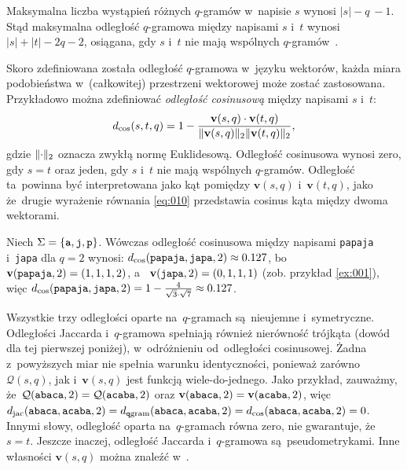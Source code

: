 \documentclass{praca1}
\DeclarePairedDelimiter{\norm}{\lVert}{\rVert}
\begin{document}

Maksymalna liczba wystąpień różnych $q$-gramów w~napisie $s$ wynosi $|s| - q~- 1$. Stąd maksymalna odległość $q$-gramowa między napisami $s$ i~$t$ wynosi $|s| + |t| - 2q - 2$, osiągana, gdy $s$ i~$t$ nie mają wspólnych $q$-gramów~\cite{Loo2014:stringdist}.

Skoro zdefiniowana została odległość $q$-gramowa w~języku wektorów, każda miara podobieństwa w~(całkowitej) przestrzeni wektorowej może zostać zastosowana. Przykładowo można zdefiniować \emph{odległość cosinusową} między napisami $s$ i~$t$:
\begin{equation}
\label{eq:010}
d_{\mathrm{cos}}(s,t,q) = 1 - \frac{ \mathbf{v}(s,q) \cdot \mathbf{v}(t,q) }{ \norm{\mathbf{v}(s,q)}_2  \norm{\mathbf{v}(t,q)}_2 },
\end{equation}
gdzie $\norm{\cdot}_2$ oznacza zwykłą normę Euklidesową. Odległość cosinusowa wynosi zero, gdy $s=t$ oraz jeden, gdy $s$ i~$t$ nie mają wspólnych $q$-gramów. Odległość ta~powinna być interpretowana jako kąt pomiędzy $\mathbf{v}(s,q)$ i~$\mathbf{v}(t,q)$, jako że~drugie wyrażenie równania \eqref{eq:010} przedstawia cosinus kąta między dwoma wektorami.

\begin{example}
Niech $\Sigma = \{\verb|a|, \verb|j|, \verb|p|\}$. Wówczas odległość cosinusowa między napisami \verb|papaja| i~\verb|japa| dla $q = 2$ wynosi: $d_{\mathrm{cos}}(\verb|papaja|, \verb|japa|, 2) \approx 0.127$, bo~$\mathbf{v}( \verb|papaja|,2) = (1, 1, 1, 2)$, a~ $\mathbf{v}( \verb|japa|,2) = (0, 1, 1, 1)$ (zob. przykład \ref{ex:001}), więc $d_{\mathrm{cos}}(\verb|papaja|, \verb|japa|, 2) = 1 - \frac{4}{\sqrt{3}\cdot\sqrt{7}} \approx 0.127$.
\end{example}

Wszystkie trzy odległości oparte na~$q$-gramach są~nieujemne i~symetryczne. Odległości Jaccarda i~$q$-gramowa spełniają również nierówność trójkąta (dowód dla tej pierwszej poniżej), w~odróżnieniu od~odległości cosinusowej. Żadna z~powyższych miar nie spełnia warunku identyczności, ponieważ zarówno $\mathcal{Q}(s,q)$, jak i~$\mathbf{v}(s,q)$ jest funkcją wiele-do-jednego. Jako przykład, zauważmy, że~$\mathcal{Q}(\verb|abaca|,2) = \mathcal{Q}(\verb|acaba|,2)$ oraz $\mathbf{v}(\verb|abaca|,2) = \mathbf{v}(\verb|acaba|,2)$, więc $d_{\mathrm{jac}}(\verb|abaca|, \verb|acaba|, 2) = d_{\mathtt{q}\mathrm{gram}}(\verb|abaca|, \verb|acaba|, 2) = d_{\mathrm{cos}}(\verb|abaca|, \verb|acaba|, 2) = 0$. Innymi słowy, odległość oparta na~$q$-gramach równa zero, nie gwarantuje, że~$s = t$. Jeszcze inaczej, odległość Jaccarda i~$q$-gramowa są~pseudometrykami. Inne własności $\mathbf{v}(s,q)$ można znaleźć w~\cite{Ukkonen1992:approxqgrams}.
\end{document}

